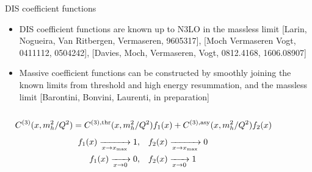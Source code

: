 \documentclass[8pt,t]{beamer}
\begin{document}
\begin{frame}{DIS coefficient functions}
  \begin{itemize}
    \item DIS coefficient functions are known up to N3LO in the massless limit {\color{gray}\footnotesize [Larin, Nogueira, Van Ritbergen, Vermaseren, 9605317], [Moch Vermaseren Vogt, 0411112, 0504242], [Davies, Moch, Vermaseren, Vogt, 0812.4168, 1606.08907]}
    \item Massive coefficient functions can be constructed by smoothly joining the known limits from threshold and high energy resummation, and the massless limit {\color{gray}\footnotesize [Barontini, Bonvini, Laurenti, in preparation]}
  \end{itemize}

  \vspace*{-0.5em}
  \begin{columns}
    \begin{column}{0.49\textwidth}
      \begin{equation*}
        C^{(3)}(x,m_h^2/Q^2) = C^{(3),{\rm thr}}(x,m_h^2/Q^2) f_1(x) + C^{(3),{\rm asy}}(x,m_h^2/Q^2) f_2(x)
      \end{equation*}
      \begin{align*}
        \begin{split}
          f_1(x) \xrightarrow[x \to x_{\rm max}]{} 1, & \quad  f_2(x) \xrightarrow[x \to x_{\rm max}]{} 0 \\
          f_1(x) \xrightarrow[x \to 0]{} 0, & \quad  f_2(x) \xrightarrow[x \to 0]{} 1
        \end{split}
      \end{align*}
    \end{column}
    \begin{column}{0.49\textwidth}


\end{column}
\end{columns}
\end{frame}
\end{document}
